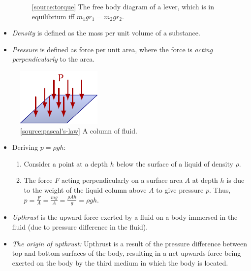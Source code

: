 \documentclass[oneside]{book}
\begin{document}
\begin{itemize}
\begin{figure}[H]
        \caption{\ref{source:torque} The free body diagram of a lever, which is in equilibrium iff \(m_1gr_1=m_2gr_2\).}
        \label{fig:torque-lever}
    \end{figure}
    \item \emph{Density} is defined as the mass per unit volume of a substance.
    \item \emph{Pressure} is defined as force per unit area, where the force is \emph{acting perpendicularly} to the area.
\end{itemize}
\begin{minipage}{0.3\textwidth}
    \begin{figure}[H]
        \centering
        \includegraphics[page=5]{../images/pressure/pressure.pdf}
        \caption{\ref{source:pascal's-law} A column of fluid.}
        \label{fig:pascal's-law}
    \end{figure}
\end{minipage}%
\begin{minipage}{0.7\textwidth}
    \begin{itemize}
        \item Deriving \(p=\rho gh\):
        \begin{enumerate}
            \item Consider a point at a depth \(h\) below the surface of a liquid of density \(\rho\). 
            \item The force \(F\) acting perpendicularly on a surface area \(A\) at depth \(h\) is due to the weight of the liquid column above \(A\) to give pressure \(p\). Thus, \(p=\frac{F}{A}=\frac{mg}{A}=\frac{\rho Ah}{g}=\rho gh\).
        \end{enumerate}
    \end{itemize}
\end{minipage}
\begin{itemize}
    \item \emph{Upthrust} is the upward force exerted by a fluid on a body immersed in the fluid (due to pressure difference in the fluid).
    \item \emph{The origin of upthrust:} Upthrust is a result of the pressure difference between top and bottom surfaces of the body, resulting in a net upwards force being exerted on the body by the third medium in which the body is located.
\end{itemize}
\end{document}
